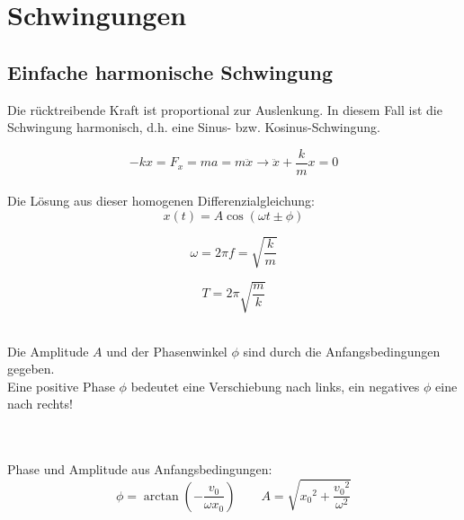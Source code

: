 



\chapter{Schwingungen}

\section{Einfache harmonische Schwingung}
Die rücktreibende Kraft ist proportional zur Auslenkung. In diesem Fall ist die Schwingung harmonisch, d.h. eine Sinus- bzw. Kosinus-Schwingung.

\[
	-kx = F_x = ma = m \ddot{x} \rightarrow \ddot{x} + \frac{k}{m}x = 0
\]
\\
Die Lösung aus dieser homogenen Differenzialgleichung:
\[\boxed{
	x(t) = A \cos(\omega t \pm \phi)
}\]

\[\boxed{
	\omega = 2 \pi f = \sqrt{\frac{k}{m}}
}\]

\[\boxed{
	T = 2 \pi \sqrt{\frac{m}{k}}
}\]
\\
\begin{footnotesize}
	Die Amplitude $A$ und der Phasenwinkel $\phi$ sind durch die Anfangsbedingungen gegeben.\\
	Eine positive Phase $\phi$ bedeutet eine Verschiebung nach links, ein negatives $\phi$ eine nach rechts!
\end{footnotesize}
\\
\\
Phase und Amplitude aus Anfangsbedingungen:
\[\boxed{
	\phi = \arctan \left( - \frac{v_0}{\omega x_0} \right)\qquad 
	A = \sqrt{{x_0}^2+\frac{{v_0}^2}{\omega^2}}
}\]



